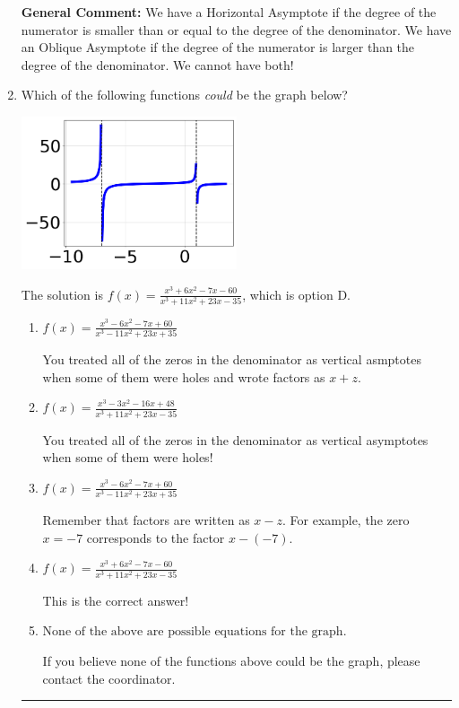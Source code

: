 \documentclass{extbook}[14pt]
\newcommand{\litem}[1]{\item #1

\rule{\textwidth}{0.4pt}}
\begin{document}
\begin{enumerate}
{\textbf{General Comment:} We have a Horizontal Asymptote if the degree of the numerator is smaller than or equal to the degree of the denominator. We have an Oblique Asymptote if the degree of the numerator is larger than the degree of the denominator. We cannot have both!
}
\litem{
Which of the following functions \textit{could} be the graph below?

\begin{center}
    \includegraphics[width=0.5\textwidth]{../Figures/identifyGraphOfRationalFunctionB.png}
\end{center}




The solution is \( f(x)=\frac{x^{3} +6 x^{2} -7 x -60}{x^{3} +11 x^{2} +23 x -35} \), which is option D.\begin{enumerate}[label=\Alph*.]
\item \( f(x)=\frac{x^{3} -6 x^{2} -7 x + 60}{x^{3} -11 x^{2} +23 x + 35} \)

You treated all of the zeros in the denominator as vertical asmptotes when some of them were holes and wrote factors as $x+z$.
\item \( f(x)=\frac{x^{3} -3 x^{2} -16 x + 48}{x^{3} +11 x^{2} +23 x -35} \)

You treated all of the zeros in the denominator as vertical asymptotes when some of them were holes!
\item \( f(x)=\frac{x^{3} -6 x^{2} -7 x + 60}{x^{3} -11 x^{2} +23 x + 35} \)

Remember that factors are written as $x-z$. For example, the zero $x=-7$ corresponds to the factor $x-(-7)$.
\item \( f(x)=\frac{x^{3} +6 x^{2} -7 x -60}{x^{3} +11 x^{2} +23 x -35} \)

This is the correct answer!
\item \( \text{None of the above are possible equations for the graph.} \)

If you believe none of the functions above could be the graph, please contact the coordinator.
\end{enumerate}

}
\end{enumerate}
\end{document}
